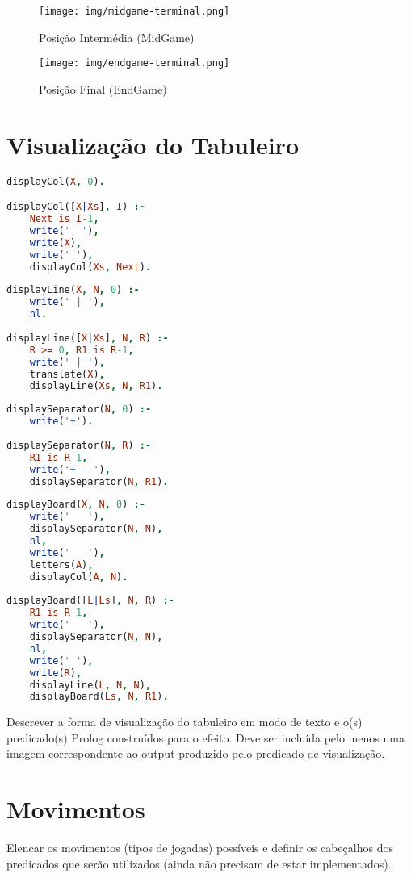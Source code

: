 \documentclass[a4paper]{article}
\begin{document}
\begin{figure}[h!]
\centering
\begin{minipage}{.4\textwidth}
  \centering
  \texttt{[image: img/midgame-terminal.png]}
  \caption{Posição Intermédia (MidGame)}
  \label{fig:mid}
\end{minipage}%
\begin{minipage}{.4\textwidth}
  \centering
  \texttt{[image: img/endgame-terminal.png]}
  \caption{Posição Final (EndGame)}
  \label{fig:end}
\end{minipage}
\end{figure}

\section{Visualização do Tabuleiro}

\begin{lstlisting}[language=Prolog]
displayCol(X, 0).

displayCol([X|Xs], I) :- 
	Next is I-1, 
	write('  '), 
	write(X), 
	write(' '), 
	displayCol(Xs, Next).
\end{lstlisting}

\begin{lstlisting}[language=Prolog]
displayLine(X, N, 0) :- 
	write(' | '), 
	nl.
	
displayLine([X|Xs], N, R) :- 
	R >= 0, R1 is R-1, 
	write(' | '),
	translate(X),
	displayLine(Xs, N, R1).
\end{lstlisting}

\begin{lstlisting}[language=Prolog]
displaySeparator(N, 0) :- 
	write('+').
	
displaySeparator(N, R) :- 
	R1 is R-1, 
	write('+---'), 
	displaySeparator(N, R1).
\end{lstlisting}

\begin{lstlisting}[language=Prolog]
displayBoard(X, N, 0) :- 
	write('   '), 
	displaySeparator(N, N), 
	nl, 
	write('   '), 
	letters(A), 
	displayCol(A, N).
	
displayBoard([L|Ls], N, R) :- 
	R1 is R-1,
	write('   '), 
	displaySeparator(N, N),
	nl, 
	write(' '), 
	write(R),
	displayLine(L, N, N),
	displayBoard(Ls, N, R1).
\end{lstlisting}

Descrever a forma de visualização do tabuleiro em modo de texto e o(s) predicado(s) Prolog construídos para o efeito.
Deve ser incluída pelo menos uma imagem correspondente ao output produzido pelo predicado de visualização.


\section{Movimentos}

Elencar os movimentos (tipos de jogadas) possíveis e definir os cabeçalhos dos predicados que serão utilizados (ainda não precisam de estar implementados).
\end{document}
